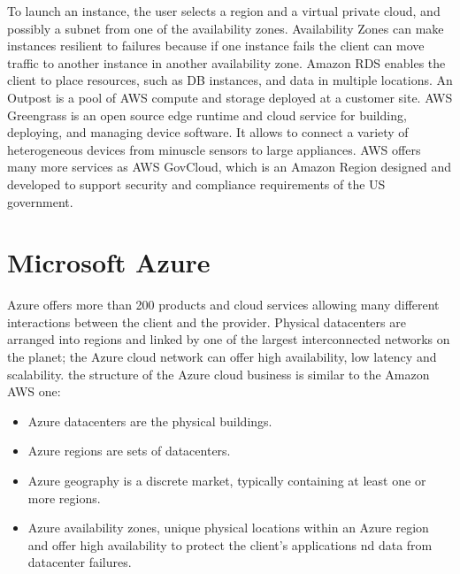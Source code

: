 To launch an instance, the user selects a region and a virtual private cloud, and possibly a subnet from one of the availability zones. Availability Zones can make instances resilient to failures because if one instance fails the client can move traffic to another instance in another availability zone. \n
Amazon RDS enables the client to place resources, such as DB instances, and data in multiple locations. \n
An Outpost is a pool of AWS compute and storage deployed at a customer site. \n
AWS Greengrass is an open source edge runtime and cloud service for building, deploying, and managing device software. It allows to connect a variety of heterogeneous devices from minuscle sensors to large appliances. \n
AWS offers many more services as AWS GovCloud, which is an Amazon Region designed and developed to support security and compliance requirements of the US government.
\section{Microsoft Azure}
Azure offers more than 200 products and cloud services allowing many different interactions between the client and the provider. \n
Physical datacenters are arranged into regions and linked by one of the largest interconnected networks on the planet; the Azure cloud network can offer high availability, low latency and scalability. \n
the structure of the Azure cloud business is similar to the Amazon AWS one:
\begin{itemize}
    \item Azure datacenters are the physical buildings.
    \item Azure regions are sets of datacenters.
    \item Azure geography is a discrete market, typically containing at least one or more regions.
    \item Azure availability zones, unique physical locations within an Azure region and offer high availability to protect the client's applications nd data from datacenter failures.
\end{itemize}
